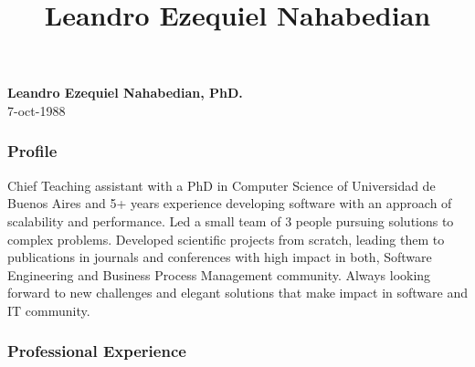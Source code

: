 \documentclass[10pt]{article}
\title{\bfseries Leandro Ezequiel Nahabedian}
\author{}
\date{}
\begin{document}
\begin{center}
{\large \textbf{Leandro Ezequiel Nahabedian, PhD.}}\\
7-oct-1988

\end{center}

\subsubsection*{Profile}
\small

Chief Teaching assistant with a PhD in Computer Science of Universidad de 
Buenos Aires and 5+ 
years experience developing software with an approach of scalability and 
performance. Led a small team of 3 people pursuing solutions to complex 
problems. Developed scientific projects from scratch, leading them to 
publications in journals and conferences with high impact in both, Software 
Engineering and Business Process Management community. 
Always looking forward to new challenges and elegant solutions that make impact 
in software and IT community.


\subsubsection*{Professional Experience}
\end{document}
